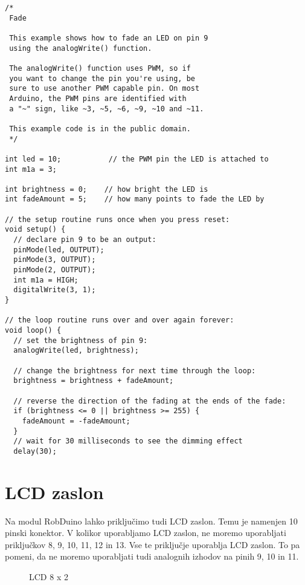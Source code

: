\documentclass[11pt,a4paper]{article}
\begin{document}
 

\begin{lstlisting}
/*
 Fade

 This example shows how to fade an LED on pin 9
 using the analogWrite() function.

 The analogWrite() function uses PWM, so if
 you want to change the pin you're using, be
 sure to use another PWM capable pin. On most
 Arduino, the PWM pins are identified with 
 a "~" sign, like ~3, ~5, ~6, ~9, ~10 and ~11.

 This example code is in the public domain.
 */

int led = 10;           // the PWM pin the LED is attached to
int m1a = 3;

int brightness = 0;    // how bright the LED is
int fadeAmount = 5;    // how many points to fade the LED by

// the setup routine runs once when you press reset:
void setup() {
  // declare pin 9 to be an output:
  pinMode(led, OUTPUT);
  pinMode(3, OUTPUT);
  pinMode(2, OUTPUT);
  int m1a = HIGH;
  digitalWrite(3, 1);
}

// the loop routine runs over and over again forever:
void loop() {
  // set the brightness of pin 9:
  analogWrite(led, brightness);

  // change the brightness for next time through the loop:
  brightness = brightness + fadeAmount;

  // reverse the direction of the fading at the ends of the fade:
  if (brightness <= 0 || brightness >= 255) {
    fadeAmount = -fadeAmount;
  }
  // wait for 30 milliseconds to see the dimming effect
  delay(30);
\end{lstlisting}






\section{LCD zaslon}
Na modul RobDuino lahko priključimo tudi LCD zaslon. Temu je namenjen 10 pinski konektor. V kolikor uporabljamo LCD zaslon, ne moremo uporabljati priključkov 8, 9, 10, 11, 12 in 13. Vse te priključje uporablja LCD zaslon. To pa pomeni, da ne moremo uporabljati tudi analognih izhodov na pinih 9, 10 in 11. 

\begin{figure} \centering
{}
\caption{LCD 8 x 2}\label{slika:lcd}
\end{figure}
\end{document}
